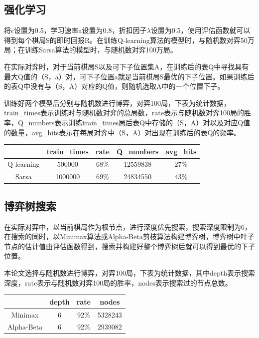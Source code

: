 \documentclass{article}
\begin{document}
\subsection{强化学习}
将$\epsilon$设置为0.5，学习速率a设置为0.8，折扣因子$\lambda$设置为0.5，使用评估函数就可以得到每个棋局S的即时回报R。在训练Q-learning算法的模型时，与随机数对弈50万局；在训练Sarsa算法的模型时，与随机数对弈100万局。
\par
在实际对弈时，对于当前棋局S以及可下子位置集A，在训练后的表Q中寻找具有最大Q值的（S，a）对，可下子位置a就是当前棋局S最优的下子位置。如果训练后的表Q中没有与（S，A）对应的Q值，则随机选取A中的一个位置下子。
\par
训练好两个模型后分别与随机数进行博弈，对弈100局，下表为统计数据，train\_times表示训练时与随机数对弈的总局数，rate表示与随机数对弈100局的胜率，Q\_numbers表示训练train\_times局后表Q中存储的（S，A）对以及对应Q值的数量，avg\_hits表示在每局对弈中（S，A）对出现在训练后的表Q的频率。
\begin{center}
    \begin{tabular}{ccccc}
        \hline
         & train\_times & rate & Q\_numbers & avg\_hits \\
        \hline
        Q-learning & 500000 & 68\% & 12559838 & 27\% \\
        Sarsa & 1000000 & 69\% & 24834550 & 43\% \\
        \hline
    \end{tabular}
\end{center}

\subsection{博弈树搜索}
在实际对弈中，以当前棋局作为根节点，进行深度优先搜索，搜索深度限制为6，在搜索的同时，以Minimax算法或Alpha-Beta剪枝算法构建博弈树，博弈树中叶子节点的估计值由评估函数得到，搜索并构建好整个博弈树后就可以得到最优的下子位置。
\par
本论文选择与随机数进行博弈，对弈100局，下表为统计数据，其中depth表示搜索深度，rate表示与随机数对弈100局的胜率，nodes表示搜索过的节点总数。
\begin{center}
    \begin{tabular}{cccc}
        \hline
         & depth & rate & nodes \\
        \hline
        Minimax & 6 & 92\% & 5328243 \\
        Alpha-Beta & 6 & 92\% & 2939082 \\
        \hline
    \end{tabular}
\end{center}
\end{document}
